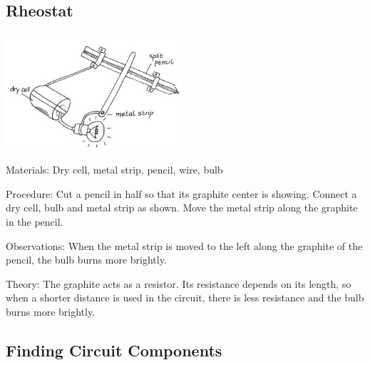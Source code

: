 \begin{multicols}{2}
\columnbreak

\subsection{Rheostat}

\begin{center}
\includegraphics[width=0.49\textwidth]{./img/vso/rheostat.jpg}
\end{center}

\begin{description*}
\item[Materials:]{Dry cell, metal strip, pencil, wire, bulb}
\item[Procedure:]{Cut a pencil in half so that its graphite center is showing. Connect a dry cell, bulb and metal strip as shown. Move the metal strip along the graphite in the pencil.}
\item[Observations:]{When the metal strip is moved to the left along the graphite of the pencil, the bulb burns more brightly.}
\item[Theory:]{The graphite acts as a resistor. Its resistance depends on its length, so when a shorter distance is used in the circuit, there is less resistance and the bulb burns more brightly.}
\end{description*}

\subsection{Finding Circuit Components}



\end{multicols}
